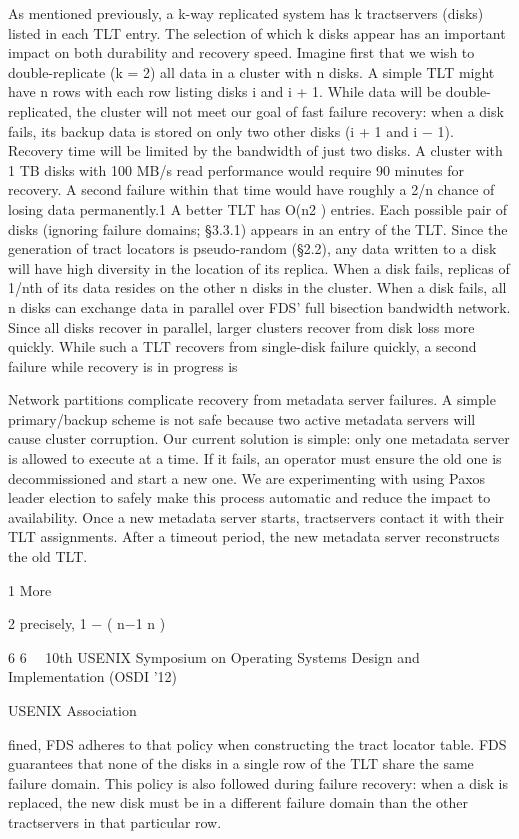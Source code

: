 As mentioned previously, a k-way replicated system
has k tractservers (disks) listed in each TLT entry. The
selection of which k disks appear has an important impact
on both durability and recovery speed.
Imagine first that we wish to double-replicate (k = 2)
all data in a cluster with n disks. A simple TLT might
have n rows with each row listing disks i and i + 1. While
data will be double-replicated, the cluster will not meet
our goal of fast failure recovery: when a disk fails, its
backup data is stored on only two other disks (i + 1 and
i − 1). Recovery time will be limited by the bandwidth of
just two disks. A cluster with 1 TB disks with 100 MB/s
read performance would require 90 minutes for recovery.
A second failure within that time would have roughly a
2/n chance of losing data permanently.1
A better TLT has O(n2 ) entries. Each possible pair
of disks (ignoring failure domains; §3.3.1) appears in an
entry of the TLT. Since the generation of tract locators
is pseudo-random (§2.2), any data written to a disk will
have high diversity in the location of its replica. When
a disk fails, replicas of 1/nth of its data resides on the
other n disks in the cluster. When a disk fails, all n disks
can exchange data in parallel over FDS’ full bisection
bandwidth network. Since all disks recover in parallel,
larger clusters recover from disk loss more quickly.
While such a TLT recovers from single-disk failure
quickly, a second failure while recovery is in progress is

Network partitions complicate recovery from metadata server failures. A simple primary/backup scheme is
not safe because two active metadata servers will cause
cluster corruption. Our current solution is simple: only
one metadata server is allowed to execute at a time. If it
fails, an operator must ensure the old one is decommissioned and start a new one. We are experimenting with
using Paxos leader election to safely make this process
automatic and reduce the impact to availability. Once a
new metadata server starts, tractservers contact it with
their TLT assignments. After a timeout period, the new
metadata server reconstructs the old TLT.

1 More

2
precisely, 1 − ( n−1
n )

6
6  10th USENIX Symposium on Operating Systems Design and Implementation (OSDI ’12)  

USENIX Association


fined, FDS adheres to that policy when constructing the
tract locator table. FDS guarantees that none of the disks
in a single row of the TLT share the same failure domain. This policy is also followed during failure recovery: when a disk is replaced, the new disk must be in a
different failure domain than the other tractservers in that
particular row.

